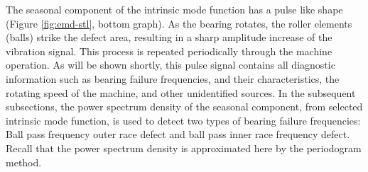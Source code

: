 \documentclass[../Main/thesis.tex]{subfiles}
\begin{document}
The seasonal component of the intrinsic mode function has a pulse like shape (Figure  \ref{fig:emd-stl}, bottom graph). As the bearing rotates, the roller elements (balls) strike the defect area, resulting in a sharp amplitude increase of the vibration signal. This process is repeated periodically through the machine operation. As will be shown shortly, this pulse signal contains all diagnostic information such as bearing failure frequencies, and their characteristics, the rotating speed of the machine, and other unidentified sources.
\justify
In the subsequent subsections, the power spectrum density of the seasonal component, from selected intrinsic mode function, is used to detect two types of bearing failure frequencies: Ball pass frequency outer race defect and ball pass inner race frequency defect. Recall that the power spectrum density is approximated here by the periodogram method.
\end{document}
